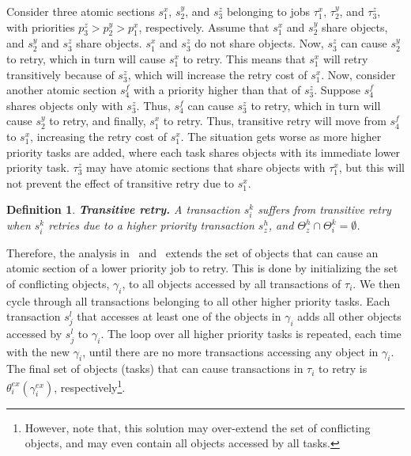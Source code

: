 \documentclass[conference,letterpaper]{IEEEtran}
\newtheorem{mydef}{Definition}
\begin{document}
Consider three atomic sections $s_{1}^{x}$, $s_{2}^{y}$, 
and $s_{3}^{z}$ belonging to jobs $\tau_{1}^{x}$, $\tau_{2}^{y}$, 
and $\tau_{3}^{z}$, with priorities $p_{3}^{z}>p_{2}^{y}>p_{1}^{x}$, respectively. 
Assume that $s_{1}^{x}$ and $s_{2}^{y}$ share objects, and $s_{2}^{y}$ and $s_{3}^{z}$ share objects. $s_{1}^{x}$ and $s_{3}^{z}$ do not share objects.
Now, $s_{3}^{z}$ can cause $s_{2}^{y}$ to retry, which in turn will cause $s_{1}^{x}$ to retry. This means that $s_{1}^{x}$ will retry transitively
because of $s_{3}^{z}$, which will increase the retry cost of $s_{1}^{x}$. Now, consider another atomic section $s_4^f$ with a priority higher than that of $s_3^z$. Suppose $s_4^f$ shares objects only with $s_3^z$. Thus, $s_4^f$ can cause $s_3^z$ to retry, which in turn will cause $s_2^y$ to retry, and finally, $s_1^x$ to retry. Thus, transitive retry will move from $s_{4}^{f}$ to $s_{1}^{x}$, increasing the retry cost of $s_{1}^{x}$. The situation gets worse as more higher priority tasks are added, where each task shares objects with its immediate lower priority task. $\tau_{3}^{z}$ may have atomic sections that share objects with $\tau_{1}^{x}$,
but this will not prevent the effect of transitive retry due to $s_{1}^{x}$.

\begin{mydef}
\label{defn:trans-retry}
\textbf{Transitive retry.} A transaction $s_{i}^{k}$ suffers from
transitive retry when $s_i^k$ retries due to a higher priority transaction $s_z^h$, and $\Theta_z^h \cap \Theta_i^k=\emptyset$.
\end{mydef}

Therefore, the analysis in~\cite{stmconcurrencycontrol:emsoft11} and~\cite{lcmdac2012} extends the set of objects that can cause an atomic section of a lower priority job to retry.  This is done by initializing the set of conflicting objects, $\gamma_i$, to all objects accessed by all transactions of $\tau_i$. We then cycle through all transactions belonging to all other higher priority tasks. Each transaction $s_j^l$ that accesses at least one of the objects in $\gamma_i$ adds all other objects accessed by $s_j^l$ to $\gamma_i$. The loop over all higher priority tasks is repeated, each time with the new $\gamma_i$, until there are no more transactions accessing any object in $\gamma_i$. The final set of objects (tasks) that can cause transactions in $\tau_i$ to retry is $\theta_i^{ex}(\gamma_i^{ex})$, respectively\footnote{However, note that, this solution may over-extend the set of conflicting objects, and may even contain all objects accessed by all tasks.}. 
\end{document}
